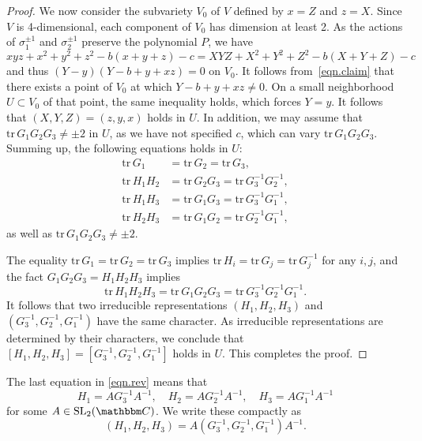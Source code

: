 \documentclass[12pt,reqno]{amsart}
\theoremstyle{definition}
\def\BC{\mathbbm C}
\def\SL{\mathrm{SL}}
\def\tr{\mathrm{tr}\,}
\begin{document}
\begin{proof}
We now consider the subvariety $V_0$ of $V$ defined by $x=Z$ and $z=X$. Since $V$ is 4-dimensional, each component of  $V_0$ has dimension at least 2. As the actions of $\sigma_1^{\pm1}$ and $\sigma_2^{\pm1}$ preserve the polynomial $P$, we have
$$xyz+x^2+y^2+z^2-b(x+y+z) -c = XYZ+X^2+Y^2+Z^2-b(X+Y+Z)-c$$
and thus $(Y-y)(Y-b+y+xz)=0$ on $V_0$. 
It follows from~\eqref{eqn.claim} that there exists a point of $V_0$ at which $Y -b+y+xz \neq 0$. On a small neighborhood $U \subset V_0$ of that point, the same inequality holds, which forces $Y=y$. It follows that $(X,Y,Z)=(z,y,x)$ holds in $U$. In addition, we may assume that $\tr G_1 G_2 G_3 \neq \pm 2$ in $U$, as we have not specified $c$, which can vary  $\tr G_1 G_2 G_3$.
Summing up, the following equations holds in $U$:
\begin{align*}
     \tr G_1 &=\tr G_2 = \tr G_3, \\
    \tr H_1 H_2 &= \tr G_2 G_3 = \tr G_3^{-1} G_2^{-1}, \\ 
    \tr H_1 H_3 &= \tr G_1 G_3 = \tr G_3^{-1} G_1^{-1}, \\ 
    \tr H_2 H_3 &= \tr G_1 G_2 = \tr G_2^{-1} G_1^{-1},
\end{align*}
as well as $\tr G_1 G_2 G_3 \neq \pm 2$.

The equality $\tr G_1 =\tr G_2 = \tr G_3$ implies $\tr H_i = \tr G_j = \tr G_j^{-1}$ for any $i,j$, and the fact $G_1 G_2 G_3 = H_1 H_2 H_3$ implies $$\tr H_1 H_2 H_3 = \tr G_1 G_2 G_3=\tr G_3^{-1} G_2^{-1} G_1^{-1}.$$  It follows that two irreducible representations $(H_1,H_2,H_3)$ and $(G_3^{-1} , G_2^{-1}, G_1^{-1})$ have the same character. As irreducible representations are determined by their characters, we conclude that $[H_1,H_2,H_3] = [G_3^{-1}, G_2^{-1}, G_1^{-1}]$ holds in $U$. This completes the proof.
\end{proof}

The last equation in \eqref{eqn.rev} means that
\begin{equation}
H_1 = A G_3^{-1} A^{-1}, \quad  H_2 = A G_2^{-1} A^{-1},\quad H_3 = A G_1^{-1} A^{-1}
\end{equation}
for some $A \in \SL_2(\BC)$. We write these compactly as 
\begin{equation}
    \label{eqn.con3}
    (H_1,H_2,H_3) = A(G_3^{-1},G_2^{-1},G_1^{-1})A^{-1}.
\end{equation}
\end{document}
